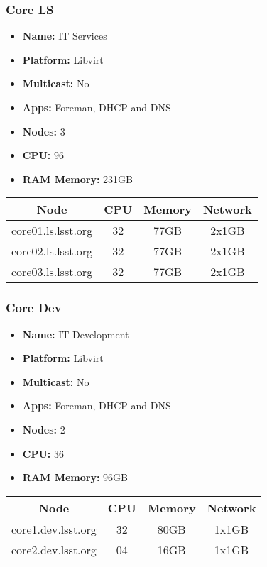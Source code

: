 \newpage
\subsubsection{Core LS}
\begin{itemize}
  \itemsep0em 
  \item \textbf{Name:}      IT Services
  \item \textbf{Platform:}        Libvirt
  \item \textbf{Multicast:}  No
  \item \textbf{Apps:}       Foreman, DHCP and DNS
  \item \textbf{Nodes:}      3
  \item \textbf{CPU:}        96
  \item \textbf{RAM Memory:} 231GB
\end{itemize}
\begin{center}
  \small
  \begin{tabular}{||c c c c||} 
    \hline
    \textbf{Node} & \textbf{CPU} & \textbf{Memory} & \textbf{Network} \\ [0.5ex]
    \hline
    core01.ls.lsst.org & 32 & 77GB & 2x1GB \\
    \hline
    core02.ls.lsst.org & 32 & 77GB & 2x1GB \\
    \hline
    core03.ls.lsst.org & 32 & 77GB & 2x1GB \\
    \hline
  \end{tabular}
\end{center}

\subsubsection{Core Dev}
\begin{itemize}
  \itemsep0em 
  \item \textbf{Name:}       IT Development
  \item \textbf{Platform:}   Libvirt
  \item \textbf{Multicast:}  No
  \item \textbf{Apps:}       Foreman, DHCP and DNS
  \item \textbf{Nodes:}      2
  \item \textbf{CPU:}        36
  \item \textbf{RAM Memory:} 96GB
\end{itemize}
\begin{center}
  \small
  \begin{tabular}{||c c c c||}
    \hline
    \textbf{Node} & \textbf{CPU} & \textbf{Memory} & \textbf{Network} \\ [0.5ex]
    \hline
    core1.dev.lsst.org & 32 & 80GB & 1x1GB \\
    \hline
    core2.dev.lsst.org & 04 & 16GB & 1x1GB \\
    \hline
  \end{tabular}
\end{center}


